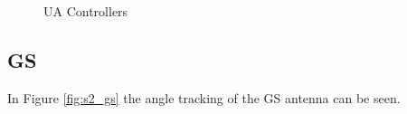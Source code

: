 \begin{figure}[H]
	\hfill
	\hfill
	\caption{UA Controllers}
	\label{fig:s1_ua}
\end{figure}

\subsection{GS}
In Figure \ref{fig:s2_gs} the angle tracking of the GS antenna can be seen.

